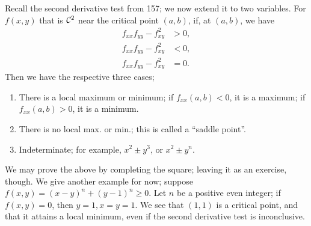 \noindent Recall the second derivative test from 157; we now extend it to two variables. For $f(x, y)$ that is $\mathcal C^2$ near the critical point $(a, b)$, if, at $(a, b)$, we have
\begin{align*}
    f_{xx} f_{yy} - f_{xy}^2 &> 0 \tag{i}, \\
    f_{xx} f_{yy} - f_{xy}^2 &< 0 \tag{ii}, \\
    f_{xx} f_{yy} - f_{xy}^2 &= 0 \tag{iii}.
\end{align*}
Then we have the respective three cases;
\begin{enumerate}[label=(\roman*)]
    \item There is a local maximum or minimum; if $f_{xx}(a, b) < 0$, it is a maximum; if $f_{xx}(a, b) > 0$, it is a minimum.
    \item There is no local max. or min.; this is called a ``saddle point''.
    \item Indeterminate; for example, $x^2 \pm y^3$, or $x^2 \pm y^n$.
\end{enumerate}
We may prove the above by completing the square; leaving it as an exercise, though. We give another example for now; suppose $f(x, y) = (x - y)^n + (y - 1)^n \geq 0$. Let $n$ be a positive even integer; if $f(x, y) = 0$, then $y = 1, x = y = 1$. We see that $(1, 1)$ is a critical point, and that it attains a local minimum, even if the second derivative test is inconclusive. 